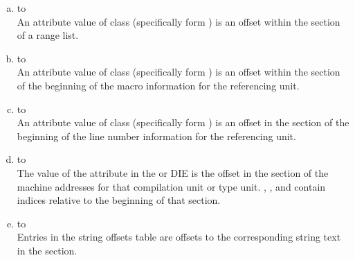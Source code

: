 \begin{enumerate}[(a)]
\item \dotdebuginfo{} to \dotdebugranges \\
An attribute value of class  
(specifically form
\DWFORMsecoffset) 
is an offset within the \dotdebugranges{} section of
a range list.

\item \dotdebuginfo{} to \dotdebugmacinfo \\
An attribute value of class 
 (specifically form
\DWFORMsecoffset) is an 
offset within the 
\dotdebugmacinfo{} section
of the beginning of the macro information for the referencing unit.

\item \dotdebuginfo{} to \dotdebugline \\
An attribute value of class 
 (specifically form
\DWFORMsecoffset) 
is an offset in the 
\dotdebugline{} section of the
beginning of the line number information for the referencing unit.

\item \dotdebuginfo{} to \dotdebugaddr \\
The value of the \DWATaddrbase{} attribute in the
\DWTAGcompileunit{} or \DWTAGpartialunit{} DIE is the
offset in the \dotdebugaddr{} section of the machine
addresses for that compilation unit or type unit.
\DWFORMaddrx, \DWOPaddrx, and \DWOPconstx{} contain
indices relative to the beginning of that section.

\item \dotdebugstroffsets{} to \dotdebugstr \\
Entries in the string offsets table
are offsets to the corresponding string text in the 
\dotdebugstr{} section.

\end{enumerate}
